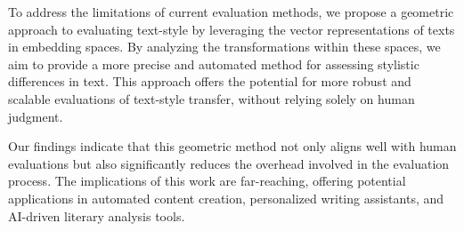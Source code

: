 To address the limitations of current evaluation methods, we propose a geometric approach to evaluating text-style by leveraging the vector representations of texts in embedding spaces. By analyzing the transformations within these spaces, we aim to provide a more precise and automated method for assessing stylistic differences in text. This approach offers the potential for more robust and scalable evaluations of text-style transfer, without relying solely on human judgment.

Our findings indicate that this geometric method not only aligns well with human evaluations but also significantly reduces the overhead involved in the evaluation process. The implications of this work are far-reaching, offering potential applications in automated content creation, personalized writing assistants, and AI-driven literary analysis tools.
